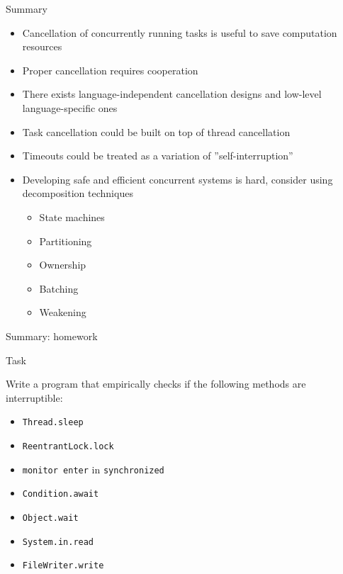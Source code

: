 \begin{frame}{Summary}

\begin{itemize}
    \item Cancellation of concurrently running tasks is useful to save computation resources
    \item Proper cancellation requires cooperation
    \item There exists language-independent cancellation designs and low-level language-specific ones
    \item Task cancellation could be built on top of thread cancellation
    \item Timeouts could be treated as a variation of ''self-interruption''
    \item Developing safe and efficient concurrent systems is hard, consider using decomposition techniques
    \begin{itemize}
        \item State machines
        \item Partitioning
        \item Ownership
        \item Batching
        \item Weakening
    \end{itemize}
\end{itemize}
\end{frame}


\begin{frame}{Summary: homework}

\begin{homeworkmail}{Task~\taskCheckInterruptible}{
  Write a program that empirically checks if the following methods are interruptible:
  \begin{itemize}
    \item \texttt{Thread.sleep}
    \item \texttt{ReentrantLock.lock}
    \item \texttt{monitor enter} in \texttt{synchronized}
    \item \texttt{Condition.await}
    \item \texttt{Object.wait}
    \item \texttt{System.in.read}
    \item \texttt{FileWriter.write}
  \end{itemize}
}
\end{homeworkmail}

\end{frame}


